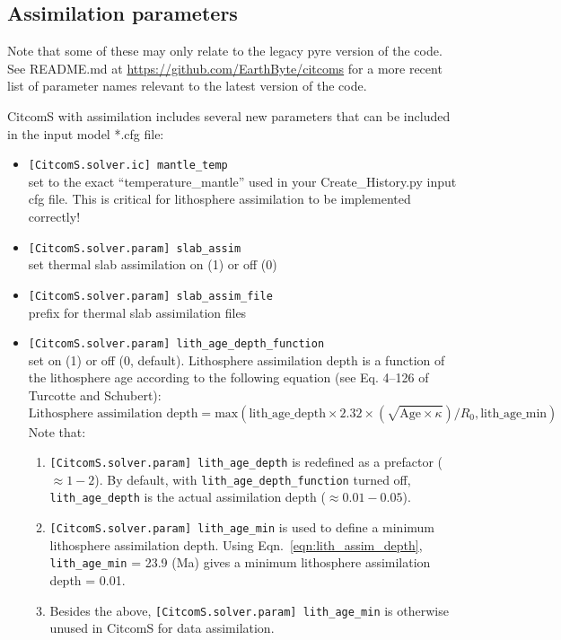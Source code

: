 \documentclass[letterpaper,12pt]{article}
\begin{document}
\subsection{Assimilation parameters}
Note that some of these may only relate to the legacy pyre version of the code.  See README.md at \url{https://github.com/EarthByte/citcoms} for a more recent list of parameter names relevant to the latest version of the code.

\label{ss:assim_param}
CitcomS with assimilation includes several new parameters that can be included in the input model *.cfg file:
\begin{itemize}
\item \verb#[CitcomS.solver.ic] mantle_temp#\\ set to the exact ``temperature\_mantle'' used in your Create\_History.py input cfg file.  This is critical for lithosphere assimilation to be implemented correctly!
\item \verb#[CitcomS.solver.param] slab_assim#\\ set thermal slab assimilation on (1) or off (0)
\item \verb#[CitcomS.solver.param] slab_assim_file#\\ prefix for thermal slab assimilation files
\item \verb#[CitcomS.solver.param] lith_age_depth_function#\\ set on (1) or off (0, default).  Lithosphere assimilation depth is a function of the lithosphere age according to the following equation (see Eq. 4--126 of Turcotte and Schubert):
\begin{equation}
\label{eqn:lith_assim_depth}
\textrm{Lithosphere assimilation depth} =  \textrm{max}(\textrm{lith\_age\_depth} \times 2.32 \times (\sqrt{\textrm{Age} \times \kappa}) / R_0, \textrm{lith\_age\_min})
\end{equation}
Note that:
\begin{enumerate}
\item \verb#[CitcomS.solver.param] lith_age_depth# is redefined as a prefactor ($\approx 1-2$).  By default, with \verb#lith_age_depth_function# turned off, \verb#lith_age_depth# is the actual assimilation depth ($\approx 0.01-0.05$).
\item \verb#[CitcomS.solver.param] lith_age_min# is used to define a minimum lithosphere assimilation depth.  Using Eqn.~\ref{eqn:lith_assim_depth}, \verb#lith_age_min# = 23.9 (Ma) gives a minimum lithosphere assimilation depth = 0.01.
\item Besides the above, \verb#[CitcomS.solver.param] lith_age_min# is otherwise unused in CitcomS for data assimilation.

\end{enumerate}
\end{itemize}
\end{document}
